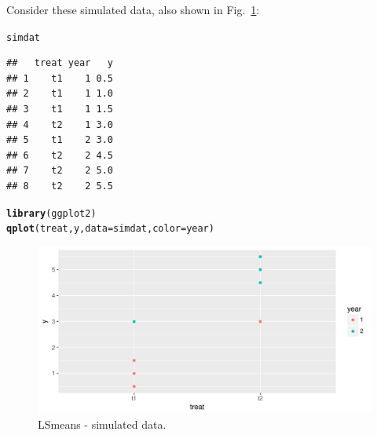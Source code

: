 \documentclass[10pt]{article}\usepackage[]{graphicx}\usepackage[]{color}
\makeatletter
\def\maxwidth{ %
  \ifdim\Gin@nat@width>\linewidth
    \linewidth
  \else
    \Gin@nat@width
  \fi
}
\newcommand{\hlstd}[1]{\textcolor[rgb]{0.345,0.345,0.345}{#1}}%
\newcommand{\hlkwc}[1]{\textcolor[rgb]{0.333,0.667,0.333}{#1}}%
\newcommand{\hlkwd}[1]{\textcolor[rgb]{0.737,0.353,0.396}{\textbf{#1}}}%
\newenvironment{kframe}{%
 \def\at@end@of@kframe{}%
 \ifinner\ifhmode%
  \def\at@end@of@kframe{\end{minipage}}%
  \begin{minipage}{\columnwidth}%
 \fi\fi%
 \def\FrameCommand##1{\hskip\@totalleftmargin \hskip-\fboxsep
 \colorbox{shadecolor}{##1}\hskip-\fboxsep
     \hskip-\linewidth \hskip-\@totalleftmargin \hskip\columnwidth}%
 \MakeFramed {\advance\hsize-\width
   \@totalleftmargin\z@ \linewidth\hsize
   \@setminipage}}%
 {\par\unskip\endMakeFramed%
 \at@end@of@kframe}
\newenvironment{knitrout}{}{} %
\makeatother
\begin{document}
Consider these simulated data, also shown in Fig.~\ref{fig:simdat2-fig}:
\begin{knitrout}
\color{fgcolor}\begin{kframe}
\begin{alltt}
\hlstd{simdat}
\end{alltt}
\begin{verbatim}
##   treat year   y
## 1    t1    1 0.5
## 2    t1    1 1.0
## 3    t1    1 1.5
## 4    t2    1 3.0
## 5    t1    2 3.0
## 6    t2    2 4.5
## 7    t2    2 5.0
## 8    t2    2 5.5
\end{verbatim}
\end{kframe}
\end{knitrout}

\begin{knitrout}
\color{fgcolor}\begin{kframe}
\begin{alltt}
\hlkwd{library}\hlstd{(ggplot2)}
\hlkwd{qplot}\hlstd{(treat, y,} \hlkwc{data}\hlstd{=simdat,} \hlkwc{color}\hlstd{=year)}
\end{alltt}
\end{kframe}\begin{figure}
\includegraphics[width=\maxwidth]{figures/LSmeanssimdat2-fig-1} \caption[LSmeans - simulated data]{LSmeans - simulated data.}\label{fig:simdat2-fig}
\end{figure}


\end{knitrout}
\end{document}
